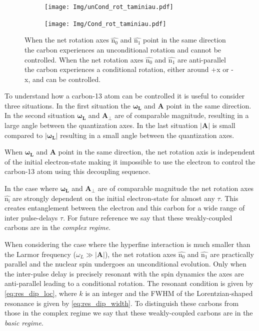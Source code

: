 \begin{figure}[htbp]
    \begin{subfigure}[t]{0.49\textwidth}\centering
        \centering
        \caption{}
        \texttt{[image: Img/unCond\_rot\_taminiau.pdf]}
        \label{fig:uncond_rot}
    \end{subfigure}
    \begin{subfigure}[t]{0.49\textwidth}\centering
        \centering
        \caption{}
        \texttt{[image: Img/Cond\_rot\_taminiau.pdf]}
        \label{fig:cond_rot}
    \end{subfigure}
    \caption{ When the net rotation axes $\bm{\hat{\mathrm{n_0}}}$ and $\bm{\hat{\mathrm{n_1}}}$ point in the same direction the carbon experiences an unconditional rotation and cannot be controlled.  When the net rotation axes $\bm{\hat{\mathrm{n_0}}}$ and $\bm{\hat{\mathrm{n_1}}}$ are anti-parallel the carbon experiences a conditional rotation, either around +x or -x, and can be controlled.}
    \label{fig:conditional_and_unconditional_rotation}
\end{figure}


To understand how a carbon-13 atom can be controlled it is useful to consider three situations. In the first situation the $\bm{\omega_L}$ and $\bm{A}$ point in the same direction. In the second situation $\bm{\omega_L}$ and $\bm{A_\perp}$ are of comparable magnitude, resulting in a large angle between the quantization axes. In the last situation $|\bm{A}|$ is small compared to  $\bm{|\omega_L|}$ resulting in a small angle between the quantization axes.

When $\bm{\omega_L}$ and $\bm{A}$ point in the same direction, the net rotation axis is independent of the initial electron-state making it impossible to use the electron to control the carbon-13 atom using this decoupling sequence.

In the case where $\bm{\omega_L}$ and $\bm{A_\perp}$ are of comparable magnitude the net rotation axes $\bm{\hat{\mathrm{n_i}}}$ are strongly dependent on the initial electron-state for almost any $\tau$. This creates entanglement between the electron and this carbon for a wide range of inter pulse-delays $\tau$. For future reference we say that these weakly-coupled carbons are in the \emph{complex regime}.

When considering the case where the hyperfine interaction is much smaller than the Larmor frequency ($\omega_L \gg |\bm{A}|$), the net rotation axes  $\hat{\mathrm{n_0}}$ and $\hat{\mathrm{n_1}}$ are practically parallel and the nuclear spin undergoes an unconditional evolution.
Only when the inter-pulse delay is precisely resonant with the spin dynamics the axes are anti-parallel leading to a conditional rotation\citep{Taminiau2012Detection}.
The resonant condition is given by \cref{eq:res_dip_loc}, where $k$ is an integer and the FWHM of the Lorentzian-shaped resonance is given by \cref{eq:res_dip_width}.
To distinguish these carbons from those in the complex regime we say that these weakly-coupled carbons are in the \emph{basic regime}.

